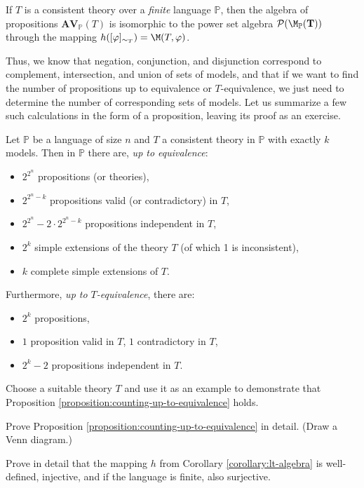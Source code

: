 \begin{corollary}\label{corollary:lt-algebra}
If $T$ is a consistent theory over a \emph{finite} language $\mathbb{P}$, then the algebra of propositions $\mathbf{AV}_\mathbb{P}(T)$ is isomorphic to the power set algebra $\mathbf{\mathcal{P}(\M_\mathbb{P}(T))}$ through the mapping $h([\varphi]_{\sim_T}) = \M(T,\varphi)$.
\end{corollary}

Thus, we know that negation, conjunction, and disjunction correspond to complement, intersection, and union of sets of models, and that if we want to find the number of propositions up to equivalence or $T$-equivalence, we just need to determine the number of corresponding sets of models. Let us summarize a few such calculations in the form of a proposition, leaving its proof as an exercise.

\begin{proposition}\label{proposition:counting-up-to-equivalence}
Let $\mathbb{P}$ be a language of size $n$ and $T$ a consistent theory in $\mathbb P$ with exactly $k$ models. Then in $\mathbb{P}$ there are, \emph{up to equivalence}:
\begin{itemize}
    \item $2^{2^n}$ propositions (or theories),
    \item $2^{2^n - k}$ propositions valid (or contradictory) in $T$,
    \item $2^{2^n} - 2 \cdot 2^{2^n - k}$ propositions independent in $T$,
    \item $2^k$ simple extensions of the theory $T$ (of which 1 is inconsistent),
    \item $k$ complete simple extensions of $T$.
\end{itemize}
Furthermore, \emph{up to $T$-equivalence}, there are:
\begin{itemize}
    \item $2^k$ propositions,
    \item $1$ proposition valid in $T$, $1$ contradictory in $T$,
    \item $2^k - 2$ propositions independent in $T$.
\end{itemize}
\end{proposition}

\begin{exercise}
    Choose a suitable theory $T$ and use it as an example to demonstrate that Proposition \ref{proposition:counting-up-to-equivalence} holds.
\end{exercise}

\begin{exercise}
    Prove Proposition \ref{proposition:counting-up-to-equivalence} in detail. (Draw a Venn diagram.)
\end{exercise}

\begin{exercise}
    Prove in detail that the mapping $h$ from Corollary \ref{corollary:lt-algebra} is well-defined, injective, and if the language is finite, also surjective.
\end{exercise}
